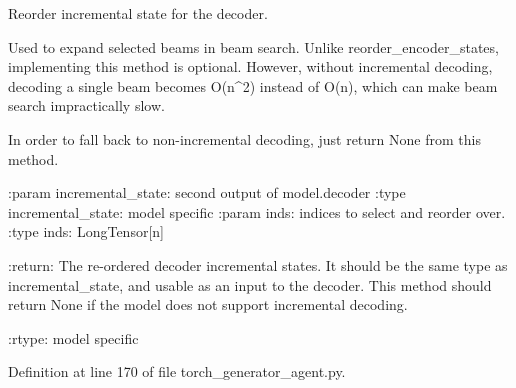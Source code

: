 \begin{DoxyVerb}Reorder incremental state for the decoder.

Used to expand selected beams in beam search. Unlike reorder_encoder_states,
implementing this method is optional. However, without incremental decoding,
decoding a single beam becomes O(n^2) instead of O(n), which can make
beam search impractically slow.

In order to fall back to non-incremental decoding, just return None from this
method.

:param incremental_state:
    second output of model.decoder
:type incremental_state:
    model specific
:param inds:
    indices to select and reorder over.
:type inds:
    LongTensor[n]

:return:
    The re-ordered decoder incremental states. It should be the same
    type as incremental_state, and usable as an input to the decoder.
    This method should return None if the model does not support
    incremental decoding.

:rtype:
    model specific
\end{DoxyVerb}
 

Definition at line 170 of file torch\+\_\+generator\+\_\+agent.\+py.


